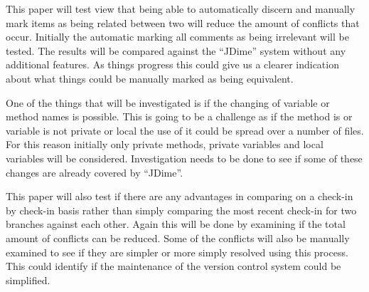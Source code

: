 \documentclass[12pt]{CRPITStyle}
\begin{document}
This paper will test view that being able to automatically discern and manually mark items as being related between two will reduce the amount of conflicts that occur. Initially the automatic marking all comments as being irrelevant will be tested. The results will be compared against the ``JDime'' system without any additional features. As things progress this could give us a clearer indication about what things could be manually marked as being equivalent. 

One of the things that will be investigated is if the changing of variable or method names is possible. This is going to be a challenge as if the method is or variable is not private or local the use of it could be spread over a number of files. For this reason initially only private methods, private variables and local variables will be considered. Investigation needs to be done to see if some of these changes are already covered by ``JDime''. 

This paper will also test if there are any advantages in comparing on a check-in by check-in basis rather than simply comparing the most recent check-in for two branches against each other. Again this will be done by examining if the total amount of conflicts can be reduced. Some of the conflicts will also be manually examined to see if they are simpler or more simply resolved using this process. This could identify if the maintenance of the version control system could be simplified.



\end{document}
